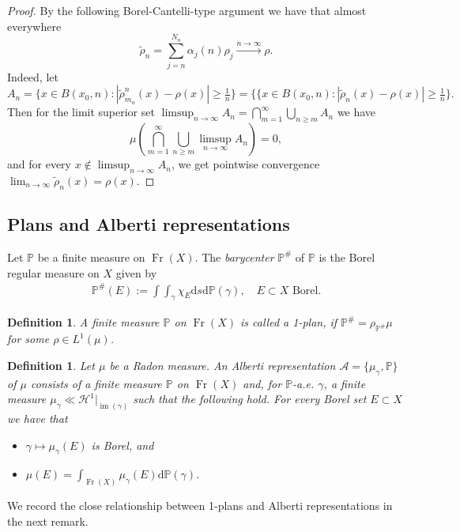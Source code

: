 \documentclass{amsart}
\newtheorem{definition}[theorem]{Definition}
\numberwithin{equation}{section}
\renewcommand{\P}{\mathbb{P}}
\newcommand{\Ha}{\mathcal{H}}
\newcommand{\im}{\operatorname{im}}
\newcommand{\Fr}{\operatorname{Fr}}
\newcommand{\ud}{\mathrm {d}}
\begin{document}
\begin{proof}
By the following Borel-Cantelli-type argument we have that almost everywhere
\[
\tilde{\rho}_n=\sum_{j=n}^{N_n} \alpha_j(n) \rho_j \stackrel{n\to\infty}{\longrightarrow} \rho.
\]
Indeed, let $A_n=\{x\in B(x_0,n): |\tilde{\rho}^n_{m_n}(x)-\rho(x)|\geq\frac{1}{n}\}=\{\{x\in B(x_0,n): |\tilde{\rho}_{n}(x)-\rho(x)|\geq\frac{1}{n}\}.$ Then for the limit superior set $\displaystyle \limsup_{n\to \infty} A_n = \bigcap_{m=1}^\infty \bigcup_{n\geq m} A_n$  we have 
\[
\mu\left(\bigcap_{m=1}^\infty \bigcup_{n\geq m} \limsup_{n\to \infty} A_n\right) = 0,
\]and for every $x\not\in \limsup_{n\to \infty} A_n$, we get pointwise convergence $\lim_{n\to \infty}\tilde{\rho}_n(x)=\rho(x)$. 
\end{proof}


\subsection{Plans and Alberti representations}\label{sec:1-plan+alb-rep}
Let $\P$ be a finite measure on $\Fr(X)$. The \emph{barycenter} $\P^\#$ of $\P$ is the Borel regular measure on $X$ given by
\begin{align*}
\P^\#(E):=\int\int_\gamma\chi_E\ud s\ud\P(\gamma),\quad E\subset X\textrm{ Borel.}
\end{align*}
\begin{definition}\label{def:1-plan}
A finite measure $\P$ on $\Fr(X)$ is called a 1-plan, if $\P^\#=\rho_{\P^\#}\mu$ for some $\rho\in L^1(\mu)$.
\end{definition}

\begin{definition}\label{def:alberti-rep}
Let $\mu$ be a Radon measure. An Alberti representation $\mathcal A=\{\mu_\gamma,\P\}$ of $\mu$ consists of a finite measure $\P$ on $\Fr(X)$ and, for $\P$-a.e. $\gamma$, a finite measure $\mu_\gamma\ll\Ha^1|_{\im(\gamma)}$ such that the following hold. For every Borel set $E\subset X$ we have that 
\begin{itemize}
    \item[(a)] $\displaystyle \gamma\mapsto \mu_\gamma(E)$ is Borel, and
    \item[(b)]$ \displaystyle \mu(E)=\int_{\Fr(X)}\mu_\gamma(E)\ud\P(\gamma)$.
\end{itemize}
\end{definition}

We record the close relationship between 1-plans and Alberti representations in the next remark.
\end{document}
